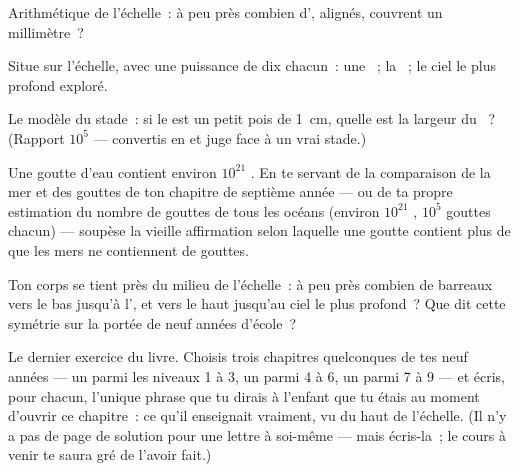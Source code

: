 \begin{exercise}[$\star$]\label{exo:g9:atoms-to-galaxies:7}
Arithmétique de l'échelle~: à peu près combien d', alignés,
couvrent un millimètre~?
\end{exercise}

\begin{exercise}[$\star$]\label{exo:g9:atoms-to-galaxies:8}
Situe sur l'échelle, avec une puissance de dix chacun~: une
~; la ~; le ciel le plus profond exploré.
\end{exercise}

\begin{exercise}[$\star\star$]\label{exo:g9:atoms-to-galaxies:9}
Le modèle du stade~: si le  est un petit pois de \qty{1}{cm},
quelle est la largeur du ~? (Rapport $10^{5}$ ---
convertis en  et juge face à un vrai stade.)
\end{exercise}

\begin{exercise}[$\star\star$]\label{exo:g9:atoms-to-galaxies:10}
Une goutte d'eau contient environ $10^{21}$ . En te servant
de la comparaison de la mer et des gouttes de ton chapitre de
septième année --- ou de ta propre estimation du nombre de gouttes de
tous les océans (environ $10^{21}$ , $10^{5}$ gouttes chacun)
--- soupèse la vieille affirmation selon laquelle une goutte contient
plus de  que les mers ne contiennent de gouttes.
\end{exercise}

\begin{exercise}[$\star\star$]\label{exo:g9:atoms-to-galaxies:11}
Ton corps se tient près du milieu de l'échelle~: à peu près combien de
barreaux vers le bas jusqu'à l', et vers le haut jusqu'au ciel le
plus profond~? Que dit cette symétrie sur la portée de neuf années
d'école~?
\end{exercise}

\begin{exercise}[$\star\star\star$]\label{exo:g9:atoms-to-galaxies:12}
Le dernier exercice du livre. Choisis trois chapitres quelconques de
tes neuf années --- un parmi les niveaux 1 à 3, un parmi 4 à 6, un
parmi 7 à 9 --- et écris, pour chacun, l'unique phrase que tu dirais à
l'enfant que tu étais au moment d'ouvrir ce chapitre~: ce qu'il
enseignait vraiment, vu du haut de l'échelle. (Il n'y a pas de page de
solution pour une lettre à soi-même --- mais écris-la~; le cours à
venir te saura gré de l'avoir fait.)
\end{exercise}

